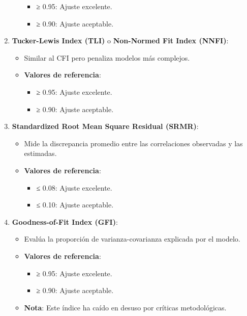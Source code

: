 \documentclass[
]{article}
\providecommand{\tightlist}{%
  \setlength{\itemsep}{0pt}\setlength{\parskip}{0pt}}
\begin{document}
\begin{enumerate}
\begin{itemize}
    \begin{itemize}
    \tightlist
    \item
      ≥ 0.95: Ajuste excelente.
    \item
      ≥ 0.90: Ajuste aceptable.
    \end{itemize}
  \end{itemize}
\item
  \textbf{Tucker-Lewis Index (TLI)} o \textbf{Non-Normed Fit Index
  (NNFI)}:

  \begin{itemize}
  \tightlist
  \item
    Similar al CFI pero penaliza modelos más complejos.
  \item
    \textbf{Valores de referencia}:

    \begin{itemize}
    \tightlist
    \item
      ≥ 0.95: Ajuste excelente.
    \item
      ≥ 0.90: Ajuste aceptable.
    \end{itemize}
  \end{itemize}
\item
  \textbf{Standardized Root Mean Square Residual (SRMR)}:

  \begin{itemize}
  \tightlist
  \item
    Mide la discrepancia promedio entre las correlaciones observadas y
    las estimadas.
  \item
    \textbf{Valores de referencia}:

    \begin{itemize}
    \tightlist
    \item
      ≤ 0.08: Ajuste excelente.
    \item
      ≤ 0.10: Ajuste aceptable.
    \end{itemize}
  \end{itemize}
\item
  \textbf{Goodness-of-Fit Index (GFI)}:

  \begin{itemize}
  \tightlist
  \item
    Evalúa la proporción de varianza-covarianza explicada por el modelo.
  \item
    \textbf{Valores de referencia}:

    \begin{itemize}
    \tightlist
    \item
      ≥ 0.95: Ajuste excelente.
    \item
      ≥ 0.90: Ajuste aceptable.
    \end{itemize}
  \item
    \textbf{Nota}: Este índice ha caído en desuso por críticas
    metodológicas.
  \end{itemize}
\end{enumerate}
\end{document}
